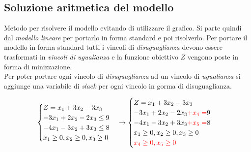 \documentclass{article}
\begin{document}

\subsection{Soluzione aritmetica del modello}
Metodo per risolvere il modello evitando di utilizzare il grafico. Si parte quindi dal \textit{modello lineare} per portarlo in forma standard e poi risolverlo. Per portare il modello in forma standard tutti i vincoli di \textit{disuguaglianza} devono essere trasformati in \textit{vincoli di ugualianza} e la funzione obiettivo $Z$ vengono poste in forma di minizzazione. \\ Per poter portare ogni vincolo di \textit{disuguaglianza} ad un vincolo di \textit{ugualianza} si aggiunge una variabile di \textit{slack} per ogni vincolo in gorma di disuguaglianza.

$$
  \begin{cases}
    Z = x_1 + 3x_2 - 3x_3     \\
    -3x_1 + 2x_2 - 2x_3 \le 9 \\
    -4x_1 - 3x_2 + 3x_3 \le 8 \\
    x_1 \ge 0,
    x_2 \ge 0,
    x_3 \ge 0
  \end{cases}
  \to
  \begin{cases}
    Z = x_1 + 3x_2 - 3x_3                         \\
    -3x_1 + 2x_2 - 2x_3 \textcolor{red}{+x_4 =} 9 \\
    -4x_1 - 3x_2 + 3x_3 \textcolor{red}{+x_5 =} 8 \\
    x_1 \ge 0,
    x_2 \ge 0,
    x_3 \ge 0                                     \\
    \textcolor{red}{x_4 \ge 0, x_5 \ge 0}
  \end{cases}
$$
\end{document}
